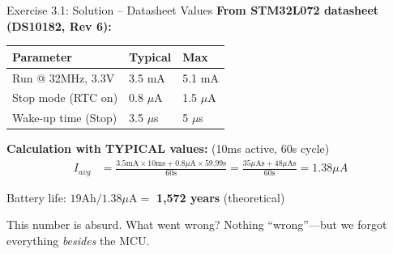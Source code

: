 \documentclass[aspectratio=169,11pt]{beamer}
\begin{document}
\begin{frame}{Exercise 3.1: Solution -- Datasheet Values}
    \textbf{From STM32L072 datasheet (DS10182, Rev 6):}
    \begin{center}
    \begin{tabular}{lll}
        \toprule
        \textbf{Parameter} & \textbf{Typical} & \textbf{Max} \\
        \midrule
        Run @ 32MHz, 3.3V & 3.5 mA & 5.1 mA \\
        Stop mode (RTC on) & 0.8 $\mu$A & 1.5 $\mu$A \\
        Wake-up time (Stop) & 3.5 $\mu$s & 5 $\mu$s \\
        \bottomrule
    \end{tabular}
    \end{center}
    
    \vspace{0.2cm}
    \textbf{Calculation with TYPICAL values:} (10ms active, 60s cycle)
    \begin{align*}
        I_{avg} &= \frac{3.5\text{mA} \times 10\text{ms} + 0.8\mu\text{A} \times 59.99\text{s}}{60\text{s}} = \frac{35\mu\text{As} + 48\mu\text{As}}{60\text{s}} = 1.38\mu A
    \end{align*}
    
    Battery life: $19\text{Ah} / 1.38\mu\text{A} = $ \textbf{1,572 years} (theoretical)
    
    \vspace{0.2cm}
    \begin{alertblock}{This number is absurd. What went wrong?}
        Nothing ``wrong''---but we forgot everything \textit{besides} the MCU.
    \end{alertblock}
\end{frame}
\end{document}
